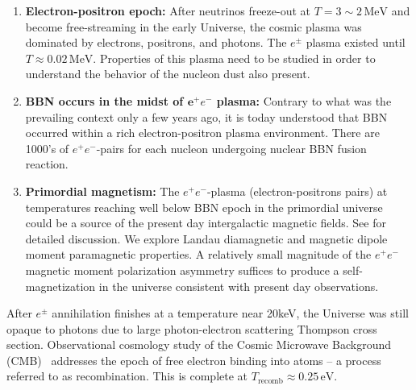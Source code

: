 {\begin{enumerate}
In this temperature epoch neutrinos were still coupled to the charged leptons via the weak interaction~\cite{Birrell:2012gg,Birrell:2014ona}, they freeze-out in the temperature range $3\,\mathrm{MeV}>T>2\,\mathrm{MeV}$, exact value depends on the neutrino's flavors and the magnitude of the PP-SM parameters, see  for detailed discussion. After neutrino freeze-out, they still play a important role in the Universe expansion via the effective number of neutrinos $N_{\nu}^{\mathrm{eff}}$, which relates to  the Hubble parameter value in current epoch.
%
\item \textbf{Electron-positron epoch:}  After neutrinos freeze-out at $T=3\sim2\,\mathrm{MeV}$ and become free-streaming in the early Universe, the cosmic plasma was dominated by electrons, positrons, and photons. The $e^\pm$ plasma existed until $T\approx 0.02\,\mathrm{MeV}$. Properties of this plasma need to be studied in order to understand the behavior of the nucleon dust also present.
%
\item \textbf{BBN occurs in the midst of ${\mathbf e^+e^-}$ plasma:} Contrary to what was the prevailing context only a few years ago, it is today understood that BBN occurred within a rich electron-positron plasma environment. There are 1000's of ${ e^+e^-}$-pairs for each nucleon undergoing nuclear BBN fusion reaction. 
%
\item \textbf{Primordial magnetism:} The $e^{+}e^{-}$-plasma (electron-positrons pairs) at temperatures reaching well below BBN epoch in the primordial universe could be a source of the present day intergalactic magnetic fields. See  for detailed discussion. We explore Landau diamagnetic and magnetic dipole moment paramagnetic properties. A relatively small magnitude of the $e^{+}e^{-}$ magnetic moment polarization asymmetry suffices to produce a self-magnetization in the universe consistent with present day observations.
\end{enumerate}

After $e^\pm$ annihilation finishes at a temperature near 20keV, the Universe was still opaque to photons due to large photon-electron scattering Thompson cross section. Observational cosmology study of the Cosmic Microwave Background (CMB)~\cite{Planck:2018vyg} addresses the epoch of free electron binding into atoms -- a process referred to as recombination. This is complete at $T_\mathrm{recomb}\approx 0.25\,\mathrm{eV}$. 

}
